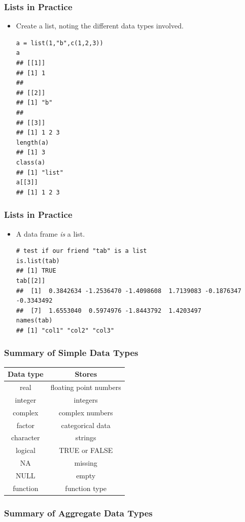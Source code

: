 \documentclass[]{article}
\theoremstyle{definition}
\theoremstyle{definition}
\theoremstyle{remark}
\begin{document}
\subsubsection{Lists in Practice}\label{lists-in-practice}

\begin{itemize}
\item
  {Create a list, noting the different data types involved.}

\begin{verbatim}
a = list(1,"b",c(1,2,3))
a
## [[1]]
## [1] 1
## 
## [[2]]
## [1] "b"
## 
## [[3]]
## [1] 1 2 3
length(a)
## [1] 3
class(a)
## [1] "list"
a[[3]]
## [1] 1 2 3
\end{verbatim}
\end{itemize}

\subsubsection{Lists in Practice}\label{lists-in-practice-1}

\begin{itemize}
\item
  {A data frame \emph{is} a list.}

\begin{verbatim}
# test if our friend "tab" is a list
is.list(tab)
## [1] TRUE
tab[[2]]
##  [1]  0.3842634 -1.2536470 -1.4098608  1.7139083 -0.1876347 -0.3343492
##  [7]  1.6553040  0.5974976 -1.8443792  1.4203497
names(tab)
## [1] "col1" "col2" "col3"
\end{verbatim}
\end{itemize}

\subsubsection{Summary of Simple Data
Types}\label{summary-of-simple-data-types-1}

\begin{longtable}[]{@{}cc@{}}
\toprule
Data type & Stores\tabularnewline
\midrule
\endhead
real & floating point numbers\tabularnewline
integer & integers\tabularnewline
complex & complex numbers\tabularnewline
factor & categorical data\tabularnewline
character & strings\tabularnewline
logical & TRUE or FALSE\tabularnewline
NA & missing\tabularnewline
NULL & empty\tabularnewline
function & function type\tabularnewline
\bottomrule
\end{longtable}

\subsubsection{Summary of Aggregate Data
Types}\label{summary-of-aggregate-data-types}
\end{document}

